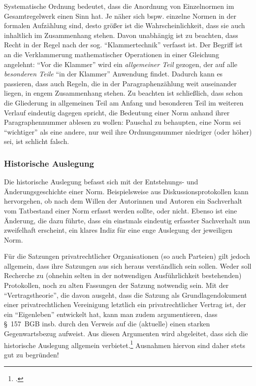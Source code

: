 Systematische Ordnung bedeutet, dass die Anordnung von Einzelnormen im Gesamtregelwerk einen Sinn hat.
Je näher sich bspw. einzelne Normen in der formalen Aufzählung sind, desto größer ist die Wahrscheinlichkeit, dass sie auch inhaltlich im Zusammenhang stehen.
Davon unabhängig ist zu beachten, dass Recht in der Regel nach der sog. \enquote{Klammertechnik} verfasst ist.
Der Begriff ist an die Verklammerung mathematischer Operationen in einer Gleichung angelehnt:
\enquote{Vor die Klammer} wird ein \emph{allgemeiner Teil} gezogen, der auf alle \emph{besonderen Teile} \enquote{in der Klammer} Anwendung findet.
Dadurch kann es passieren, dass auch Regeln, die in der Paragraphenzählung weit auseinander liegen, in engem Zusammenhang stehen.
Zu beachten ist schließlich, dass schon die Gliederung in allgemeinen Teil am Anfang und besonderen Teil im weiteren Verlauf eindeutig dagegen spricht, die Bedeutung einer Norm anhand ihrer Paragraphennummer ablesen zu wollen:
Pauschal zu behaupten, eine Norm sei \enquote{wichtiger} als eine andere, nur weil ihre Ordnungsnummer niedriger (oder höher) sei, ist schlicht falsch. 

\subsubsection{Historische Auslegung}
Die historische Auslegung befasst sich mit der Entstehungs- und Änderungsgeschichte einer Norm.
Beispielsweise aus Diskussionsprotokollen kann hervorgehen, ob nach dem Willen der Autorinnen und Autoren ein Sachverhalt vom Tatbestand einer Norm erfasst werden sollte, oder nicht.
Ebenso ist eine Änderung, die dazu führte, dass ein einstmals eindeutig erfasster Sachverhalt nun zweifelhaft erscheint, ein klares Indiz für eine enge Auslegung der jeweiligen Norm.

Für die Satzungen privatrechtlicher Organisationen (so auch Parteien) gilt jedoch allgemein, dass ihre Satzungen aus sich heraus verständlich sein sollen.
Weder soll Recherche zu (ohnehin selten in der notwendigen Ausführlichkeit bestehenden) Protokollen, noch zu alten Fassungen der Satzung notwendig sein.
Mit der \enquote{Vertragstheorie}, die davon ausgeht, dass die Satzung als Grundlagendokument einer privatrechtlichen Vereinigung letztlich ein privatrechtlicher Vertrag ist, der ein \enquote{Eigenleben} entwickelt hat, kann man zudem argumentieren, dass \S~157~BGB insb. durch den Verweis auf die (aktuelle)  einen starken Gegenwartsbezug aufweist.
Aus diesen Argumenten wird abgeleitet, dass sich die historische Auslegung allgemein verbietet.\footnote{\cite[Rn.~36]{sauter2010}.}
Ausnahmen hiervon sind daher stets gut zu begründen!

